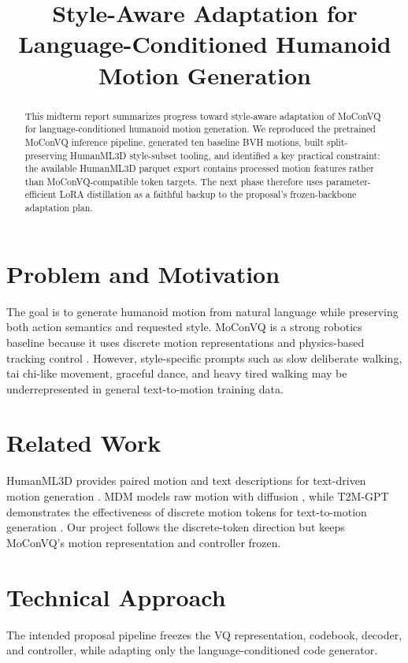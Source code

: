 \documentclass[conference]{IEEEtran}
\title{Style-Aware Adaptation for Language-Conditioned Humanoid Motion Generation}
\author{\IEEEauthorblockN{Haotian Wu, Yuhua Luo, and Xuyang Yuan}}
\begin{document}
\maketitle

\begin{abstract}
This midterm report summarizes progress toward style-aware adaptation of MoConVQ for language-conditioned humanoid motion generation. We reproduced the pretrained MoConVQ inference pipeline, generated ten baseline BVH motions, built split-preserving HumanML3D style-subset tooling, and identified a key practical constraint: the available HumanML3D parquet export contains processed motion features rather than MoConVQ-compatible token targets. The next phase therefore uses parameter-efficient LoRA distillation as a faithful backup to the proposal's frozen-backbone adaptation plan.
\end{abstract}

\IEEEpeerreviewmaketitle

\section{Problem and Motivation}
The goal is to generate humanoid motion from natural language while preserving both action semantics and requested style. MoConVQ is a strong robotics baseline because it uses discrete motion representations and physics-based tracking control \cite{yao2024moconvq}. However, style-specific prompts such as slow deliberate walking, tai chi-like movement, graceful dance, and heavy tired walking may be underrepresented in general text-to-motion training data.

\section{Related Work}
HumanML3D provides paired motion and text descriptions for text-driven motion generation \cite{guo2022humanml3d}. MDM models raw motion with diffusion \cite{tevet2023mdm}, while T2M-GPT demonstrates the effectiveness of discrete motion tokens for text-to-motion generation \cite{zhang2023t2mgpt}. Our project follows the discrete-token direction but keeps MoConVQ's motion representation and controller frozen.

\section{Technical Approach}
The intended proposal pipeline freezes the VQ representation, codebook, decoder, and controller, while adapting only the language-conditioned code generator.
\end{document}
